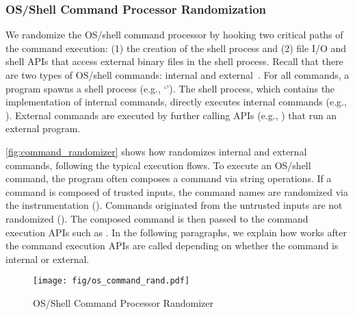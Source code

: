 \subsubsection{OS/Shell Command Processor Randomization}
\label{subsubsec:shellcommand_rand}
We randomize the OS/shell command processor by hooking two critical paths of the command execution: (1) the creation of the shell process and (2) file I/O and shell APIs that access external binary files in the shell process.
%
Recall that there are two types of OS/shell commands: internal and external~\cite{linux_commands_external_internal}. 
For all commands, a program spawns a shell process (e.g., `'). 
The shell process, which contains the implementation of internal commands, directly executes internal commands (e.g., ).
External commands are executed by further calling APIs (e.g., ) that run an external program.

\autoref{fig:command_randomizer} shows how \sysname randomizes internal and external commands, following the typical execution flows.
To execute an OS/shell command, the program often composes a command via string operations. 
If a command is composed of trusted inputs, the command names are randomized via the instrumentation (). Commands originated from the untrusted inputs are not randomized ().
The composed command is then passed to the command execution APIs such as .
In the following paragraphs, we explain how \sysname works after the command execution APIs are called depending on whether the command is internal or external.



\begin{figure}[ht]
    \centering
    \texttt{[image: fig/os\_command\_rand.pdf]}
    \vspace{-1em}
     \caption{OS/Shell Command Processor Randomizer}
     \vspace{-1em}
     \label{fig:command_randomizer}
\end{figure}

